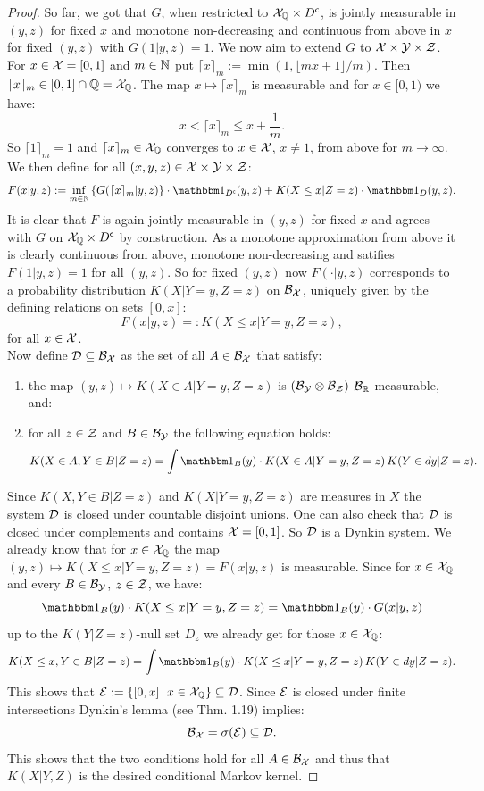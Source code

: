 \begin{Thm}
\begin{proof}
So far, we got that $G$, when restricted to $\mathcal{X}_{\mathbb{Q}} \times D^{\mathsf{c}}$,
is jointly measurable in $(y,z)$ for fixed $x$ and monotone non-decreasing and continuous from above in $x$ for fixed $(y,z)$ with $G(1|y,z)=1$.
We now aim to extend $G$ to $\mathcal{X} \times \mathcal{Y} \times \mathcal{Z}$.\\
For  $x \in \mathcal{X} =[0,1]$ and $m \in \mathbb{N}$ put $\lceil x\rceil_m:=\min(1,\lfloor mx+1\rfloor/m)$. 
Then $\lceil x\rceil_m \in [0,1] \cap \mathbb{Q} = \mathcal{X}_{\mathbb{Q}}$. 
The map $x \mapsto \lceil x\rceil_m$ is measurable and for $x \in [0,1)$ we have: 
\[ x < \lceil x\rceil_m \le x + \frac{1}{m}.\]
So $\lceil 1\rceil_m=1$ and  $\lceil x\rceil_m \in \mathcal{X}_{\mathbb{Q}}$ converges to $x \in \mathcal{X}$, $x \neq 1$, from above for $m \to \infty$.\\
We then define for all $(x,y,z) \in \mathcal{X} \times \mathcal{Y} \times \mathcal{Z}$: 
\[ F(x|y,z) := \inf_{m \in \N} \left \{ G(\lceil x\rceil_m|y,z)\right\} \cdot \I_{D^\cmpl}(y,z) +  K(X \le x|Z=z) \cdot \I_D(y,z). \]
It is clear that $F$ is again jointly measurable in $(y,z)$ for fixed $x$ and agrees with $G$  on $\mathcal{X}_{\mathbb{Q}} \times D^{\mathsf{c}}$ by construction.
As a monotone approximation from above it is clearly continuous from above, monotone non-decreasing and satifies $F(1|y,z)=1$ for all $(y,z)$.
So for fixed $(y,z)$ now $F(\cdot|y,z)$ corresponds to a probability distribution $ K(X|Y=y,Z=z)$ on $\mathcal{B}_{\mathcal{X}}$, uniquely given by the defining relations on sets $[0,x]$:
\[ F(x|y,z) =:  K(X \le x|Y=y,Z=z),\]
for all $x \in \mathcal{X}$. \\
Now define $\mathcal{D} \subseteq \mathcal{B}_{\mathcal{X}}$ as the set of all $A \in \mathcal{B}_{\mathcal{X}}$ that satisfy:
\begin{enumerate}
    \item the map $(y,z) \mapsto  K(X \in A|Y=y,Z=z)$ is $(\mathcal{B}_{\mathcal{Y}}\otimes\mathcal{B}_{\mathcal{Z}})$-$\mathcal{B}_{\mathbb{R}}$-measurable, and:
    \item for all $z \in \mathcal{Z}$ and $B \in \mathcal{B}_{\mathcal{Y}}$ the following equation holds:
        \[  K(X \in A, Y \in B |Z=z) = \int \I_B(y) \cdot  K(X \in A | Y=y,Z=z) \,  K(Y \in dy | Z=z). \]
\end{enumerate}
Since $ K(X,Y \in B|Z=z)$ and $ K(X|Y=y,Z=z)$ are measures in $X$ the system $\mathcal{D}$ is closed under countable disjoint unions. One can also check that $\mathcal{D}$ is closed under
complements and contains $\mathcal{X}=[0,1]$. So $\mathcal{D}$ is a Dynkin system.
We already know that for $x \in \mathcal{X}_{\mathbb{Q}}$ the map $(y,z) \mapsto  K(X \le x|Y=y,Z=z)=F(x|y,z)$ is measurable.
Since for $x \in \mathcal{X}_{\mathbb{Q}}$ and every $B \in \mathcal{B}_{\mathcal{Y}}$, $z \in \mathcal{Z}$, we have:
\[ \I_B(y) \cdot  K(X \le x | Y=y,Z=z) = \I_B(y) \cdot G(x|y,z) \]
up to the $ K(Y|Z=z)$-null set $D_z$ we already get for those $x \in \mathcal{X}_{\mathbb{Q}}$:
\[  K(X \le x, Y \in B |Z=z) = \int \I_B(y) \cdot  K(X \le x | Y=y,Z=z) \,  K(Y \in dy | Z=z). \]
This shows that $\mathcal{E}:=\{ [0,x] \,|\, x \in \mathcal{X}_{\mathbb{Q}}\} \subseteq \mathcal{D}$. Since $\mathcal{E}$ is closed under finite intersections 
Dynkin's lemma (see \cite{Kle20} Thm. 1.19) implies: 
\[\mathcal{B}_{\mathcal{X}}=\sigma(\mathcal{E}) \subseteq \mathcal{D}.\]
This shows that the two conditions hold for all $A \in \mathcal{B}_{\mathcal{X}}$ and thus that $ K(X|Y,Z)$ is the desired conditional Markov kernel.
\end{proof}
\end{Thm}


